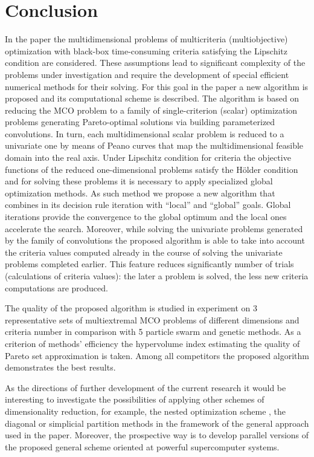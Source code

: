 \documentclass[runningheads]{llncs}
\begin{document}
\section{Conclusion}

In the paper the multidimensional problems of multicriteria (multiobjective) optimization with black-box time-consuming criteria satisfying the Lipschitz condition are considered. These assumptions lead to significant complexity of the problems under investigation and require the development of special efficient numerical methods for their solving. For this goal in the paper a new algorithm is proposed and its computational scheme is described. The algorithm is based on reducing the MCO problem to a family of single-criterion (scalar) optimization problems generating Pareto-optimal solutions via building parameterized convolutions. In turn, each multidimensional scalar problem is reduced to a univariate one by means of Peano curves that map the multidimensional feasible domain into the real axis. Under Lipschitz condition for criteria the objective functions of the reduced one-dimensional problems satisfy the H{\"o}lder condition and for solving these problems it is necessary to apply specialized global optimization methods. As such method we propose a new algorithm that combines in its decision rule iteration with ``local'' and ``global'' goals. Global iterations provide the convergence to the global optimum and the local ones accelerate the search. Moreover, while solving the univariate problems generated by the family of convolutions the proposed algorithm is able to take into account the criteria values computed already in the course of solving the univariate problems completed earlier. This feature reduces significantly number of trials (calculations of criteria values): the later a problem is solved, the less new criteria computations are produced.

The quality of the proposed algorithm is studied in experiment on 3 representative sets of multiextremal MCO problems of different dimensions and criteria number in comparison with 5 particle swarm and genetic methods. As a criterion of methods' efficiency the hypervolume index estimating the quality of Pareto set approximation is taken. Among all competitors the proposed algorithm demonstrates the best results.

As the directions of further development of the current research it would be interesting to investigate the possibilities of applying other schemes of dimensionality reduction, for example,
the nested optimization scheme \cite{Grishagin2016,Grishagin2018}, the diagonal \cite{Sergeyev2015,Sergeyev2017} or simplicial \cite{Zilinskas2011,PaulaviciusZilinskas2014} partition methods
in the framework of the general approach used in the paper. Moreover, the prospective way is to develop parallel versions of the proposed general scheme oriented at powerful supercomputer systems.




\end{document}
